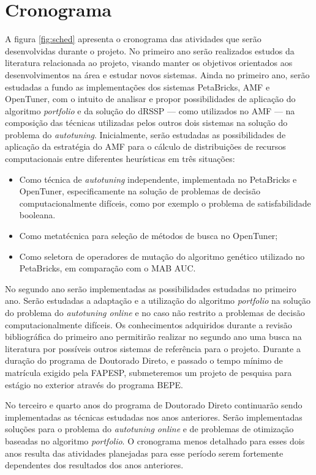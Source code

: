 \documentclass[a4paper, 11pt]{article}
\begin{document}
\section{Cronograma} \label{sec:sched}

A figura \ref{fig:sched} apresenta o cronograma das atividades que serão
desenvolvidas durante o projeto. 
No primeiro ano serão realizados estudos da literatura relacionada ao projeto,
visando manter os objetivos orientados aos desenvolvimentos na área e
estudar novos sistemas. Ainda no primeiro ano, serão estudadas a fundo as 
implementações dos sistemas PetaBricks, AMF e OpenTuner, com o intuito de 
analisar e propor possibilidades de aplicação do algoritmo \emph{portfolio} e 
da solução do dRSSP --- como utilizados no AMF --- na composição das técnicas 
utilizadas pelos outros dois sistemas na solução do problema do 
\emph{autotuning}. Inicialmente, serão estudadas as possibilidades de 
aplicação da estratégia do AMF para o cálculo de distribuições de recursos 
computacionais entre diferentes heurísticas em três situações:

\begin{itemize}
    \item Como técnica de \emph{autotuning} independente, implementada 
        no PetaBricks e OpenTuner, especificamente na solução de problemas
        de decisão computacionalmente difíceis, como por exemplo o problema
        de satisfabilidade booleana.
    \item Como metatécnica para seleção de métodos de busca no OpenTuner;
    \item Como seletora de operadores de mutação do algoritmo genético 
        utilizado no PetaBricks, em comparação com o MAB AUC.
\end{itemize}

No segundo ano serão implementadas as possibilidades estudadas no primeiro ano.
Serão estudadas a adaptação e a utilização do algoritmo \emph{portfolio} na 
solução do problema do \emph{autotuning online} e no caso não restrito a 
problemas de decisão computacionalmente difíceis. Os conhecimentos adquiridos
durante a revisão bibliográfica do primeiro ano permitirão realizar no segundo 
ano uma busca na literatura por possíveis outros sistemas de referência para o 
projeto. Durante a duração do programa de Doutorado Direto, e passado o tempo 
mínimo de matrícula exigido pela FAPESP, submeteremos um projeto de pesquisa 
para estágio no exterior através do programa BEPE.

No terceiro e quarto anos do programa de Doutorado Direto continuarão sendo 
implementadas as técnicas estudadas nos anos anteriores. Serão implementadas
soluções para o problema do \emph{autotuning online} e de problemas de 
otimização baseadas no algoritmo \emph{portfolio}. O cronograma menos detalhado
para esses dois anos resulta das atividades planejadas para esse período serem
fortemente dependentes dos resultados dos anos anteriores.
\end{document}
